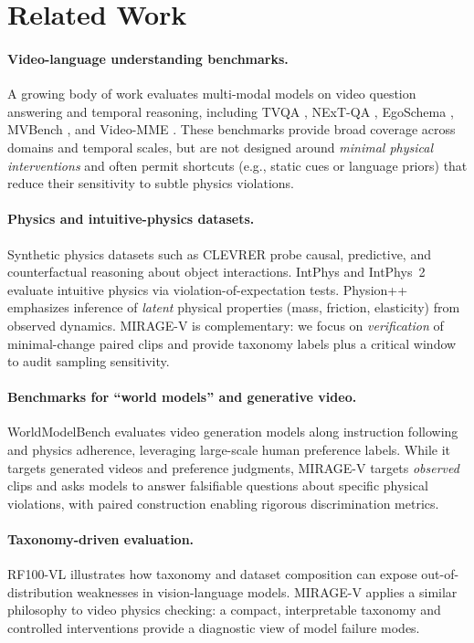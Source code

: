 \section{Related Work}
\paragraph{Video-language understanding benchmarks.}
A growing body of work evaluates multi-modal models on video question answering and temporal reasoning, including TVQA \cite{lei2018tvqa}, NExT-QA \cite{xiao2021nextqa}, EgoSchema \cite{mangalam2023egoschema}, MVBench \cite{li2023mvbench}, and Video-MME \cite{fu2024videomme}.
These benchmarks provide broad coverage across domains and temporal scales, but are not designed around \emph{minimal physical interventions} and often permit shortcuts (e.g., static cues or language priors) that reduce their sensitivity to subtle physics violations.

\paragraph{Physics and intuitive-physics datasets.}
Synthetic physics datasets such as CLEVRER \cite{yi2019clevrer} probe causal, predictive, and counterfactual reasoning about object interactions.
IntPhys \cite{riochet2018intphys} and IntPhys~2 \cite{bordes2025intphys2} evaluate intuitive physics via violation-of-expectation tests.
Physion++ \cite{tung2023physionpp} emphasizes inference of \emph{latent} physical properties (mass, friction, elasticity) from observed dynamics.
MIRAGE-V is complementary: we focus on \emph{verification} of minimal-change paired clips and provide taxonomy labels plus a critical window to audit sampling sensitivity.

\paragraph{Benchmarks for ``world models'' and generative video.}
WorldModelBench \cite{li2025worldmodelbench} evaluates video generation models along instruction following and physics adherence, leveraging large-scale human preference labels.
While it targets generated videos and preference judgments, MIRAGE-V targets \emph{observed} clips and asks models to answer falsifiable questions about specific physical violations, with paired construction enabling rigorous discrimination metrics.

\paragraph{Taxonomy-driven evaluation.}
RF100-VL \cite{robicheaux2025roboflow100vl} illustrates how taxonomy and dataset composition can expose out-of-distribution weaknesses in vision-language models.
MIRAGE-V applies a similar philosophy to video physics checking: a compact, interpretable taxonomy and controlled interventions provide a diagnostic view of model failure modes.
